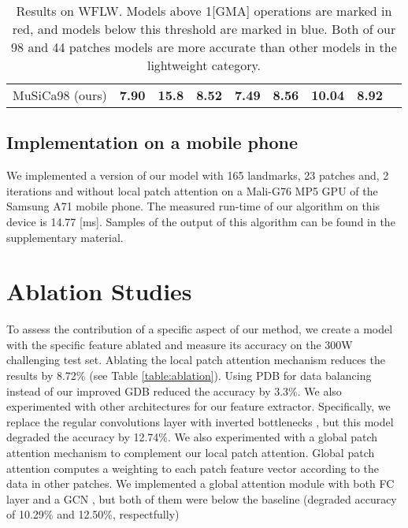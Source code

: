 \documentclass[9pt,twocolumn]{extarticle}
\begin{document}
\begin{table*}[]
\begin{tabular}{@{}lcccccccl@{}}
MuSiCa98 (ours)     & \textbf{7.90}               & \textbf{15.8}                                         & \textbf{8.52}                                               & \textbf{7.49}                                                 & \textbf{8.56}                                            & \textbf{10.04}                                             & \textbf{8.92}                                         & \cellcolor[HTML]{0000FF}                       
\end{tabular}
\caption{Results on WFLW. Models above 1[GMA] operations are marked in red, and models below this threshold are marked in blue. Both of our 98 and 44 patches models are more accurate than other models in the lightweight category.}
\label{table:wflw}
\end{table*}
\subsection{Implementation on a mobile phone}

We implemented a version of our model with 165 landmarks, 23 patches and, 2 iterations and without local patch attention on a Mali-G76 MP5 GPU of the Samsung A71 mobile phone. The measured run-time of our algorithm on this device is 14.77 [ms]. Samples of the output of this algorithm can be found in the supplementary material.


\section{Ablation Studies}

To assess the contribution of a specific aspect of our method, we create a model with the specific feature ablated and measure its accuracy on the 300W challenging test set. Ablating the local patch attention mechanism reduces the results by 8.72\% (see Table \ref{table:ablation}). Using PDB \cite{feng2018wing} for data balancing instead of our improved GDB reduced the accuracy by 3.3\%.
We also experimented with other architectures for our feature extractor. Specifically, we replace the regular convolutions layer with inverted bottlenecks \cite{sandler2018mobilenetv2}, but this model degraded the accuracy by 12.74\%. We also experimented with a global patch attention mechanism to complement our local patch attention. Global patch attention computes a weighting to each patch feature vector according to the data in other patches. We implemented a global attention module with both FC layer and a GCN \cite{kipf2016semi}, but both of them were below the baseline (degraded accuracy of 10.29\% and 12.50\%, respectfully)
\end{document}
